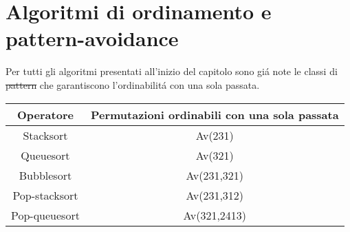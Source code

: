 \section*{Algoritmi di ordinamento e pattern-avoidance}
Per tutti gli algoritmi presentati all'inizio del capitolo 
sono gi\'a note le classi di \st{pattern} che garantiscono l'ordinabilit\'a con una sola passata. 
\begin{center}
\begin{tabular}{ |c|c| } 
\hline
\textbf{Operatore} & \textbf{Permutazioni ordinabili con una sola passata} \\ 
\hline
Stacksort\cite{limbrief} & Av(231)\\ 
Queuesort\cite{cioni2021preimages} & Av(321)\\ 
Bubblesort\cite{albert2010inverse} & Av(231,321)\\ 
Pop-stacksort\cite{magnusson2013sorting} & Av(231,312)\\ 
Pop-queuesort\cite{cioni2021sorting}& Av(321,2413)\\ 
\hline
\end{tabular}
\end{center}